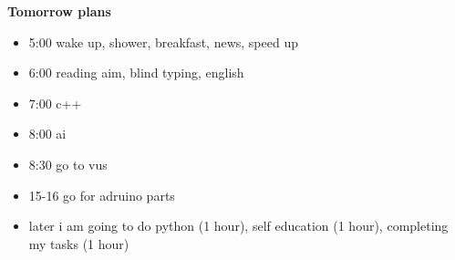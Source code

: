 \documentclass[12pt,a4paper,titlepage]{article}
\begin{document}
\begin{center}
  \large \textbf{Tomorrow plans}
\end{center}

\begin{itemize}
  \item 5:00 wake up, shower, breakfast, news, speed up
  \item 6:00 reading aim, blind typing, english
  \item 7:00 c++
  \item 8:00 ai
  \item 8:30 go to vus
  \item 15-16 go for adruino parts
  \item later i am going to do python (1 hour), self education (1 hour),
    comple\-ting my tasks (1 hour)
\end{itemize}
\end{document}
